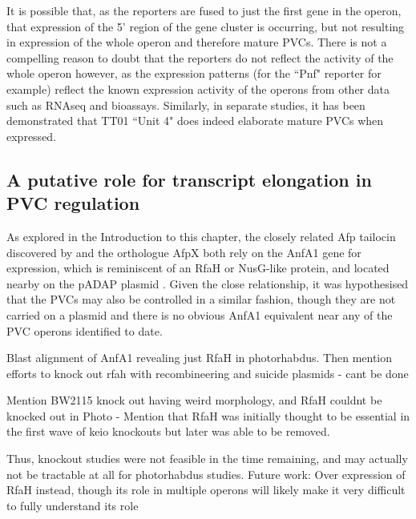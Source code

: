 It is possible that, as the reporters are fused to just the first gene in the operon, that expression of the 5' region of the gene cluster is occurring, but not resulting in expression of the whole operon and therefore mature PVCs. There is not a compelling reason to doubt that the reporters do not reflect the activity of the whole operon however, as the expression patterns (for the \Pasy{} ``Pnf" reporter for example) reflect the known expression activity of the operons from other data such as RNAseq and bioassays. Similarly, in separate studies, it has been demonstrated that \Plum{} TT01 ``Unit 4" does indeed elaborate mature PVCs when expressed.




\subsection{A putative role for transcript elongation in PVC regulation}
As explored in the Introduction to this chapter, the closely related Afp tailocin discovered by \cite{Hurst2004} and the orthologue AfpX \citep{Hurst2018} both rely on the AnfA1 gene for expression, which is reminiscent of an RfaH or NusG-like protein, and located nearby on the pADAP plasmid \citep{Hurst2007a}. Given the close relationship, it was hypothesised that the PVCs may also be controlled in a similar fashion, though they are not carried on a plasmid and there is no obvious AnfA1 equivalent near any of the PVC operons identified to date.




Blast alignment of AnfA1 revealing just RfaH in photorhabdus.
Then mention efforts to knock out rfah with recombineering and suicide plasmids - cant be done

Mention BW2115 knock out having weird morphology, and RfaH couldnt be knocked out in Photo
 - Mention that RfaH was initially thought to be essential in the first wave of keio knockouts but later was able to be removed.

Thus, knockout studies were not feasible in the time remaining, and may actually not be tractable at all for photorhabdus studies.
Future work:
	Over expression of RfaH instead, though its role in multiple operons will likely make it very difficult to fully understand its role

